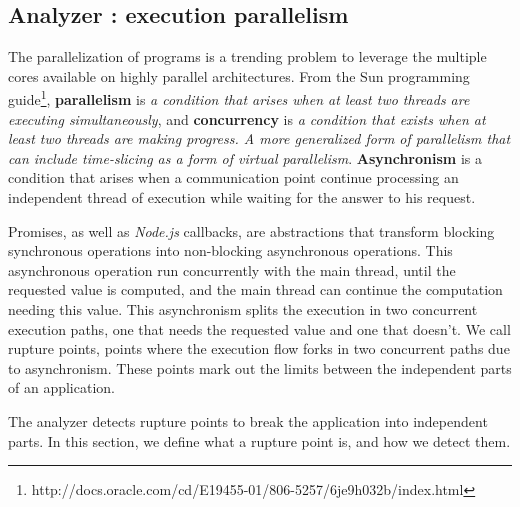 
\subsection{Analyzer : execution parallelism} \label{section:analyzer}

The parallelization of programs is a trending problem to leverage the multiple cores available on highly parallel architectures.
From the Sun programming guide\footnote{\raggedright http://docs.oracle.com/cd/E19455-01/806-5257/6je9h032b/index.html}, \textbf{parallelism} is \textit{a condition that arises when at least two threads are executing simultaneously}, and \textbf{concurrency} is \textit{a condition that exists when at least two threads are making progress. A more generalized form of parallelism that can include time-slicing as a form of virtual parallelism}.
\textbf{Asynchronism} is a condition that arises when a communication point continue processing an independent thread of execution while waiting for the answer to his request.

Promises\cite{Liskov1988}, as well as \textit{Node.js} callbacks, are abstractions that transform blocking synchronous operations into non-blocking asynchronous operations.
This asynchronous operation run concurrently with the main thread, until the requested value is computed, and the main thread can continue the computation needing this value.
This asynchronism splits the execution in two concurrent execution paths, one that needs the requested value and one that doesn't.
We call rupture points, points where the execution flow forks in two concurrent paths due to asynchronism.
These points mark out the limits between the independent parts of an application.
 
The analyzer detects rupture points to break the application into independent parts.
In this section, we define what a rupture point is, and how we detect them.

